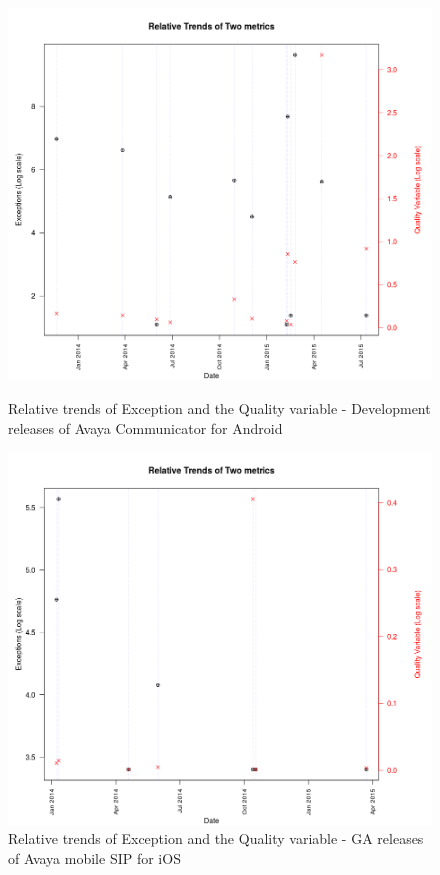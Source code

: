 \documentclass[smallcondensed]{svjour3}     %
\begin{document}
\begin{figure}[!t]
\begin{minipage}{.48\textwidth}
\raggedleft
\includegraphics[width=\linewidth]{trend_dev}
\caption{Relative trends of Exception and the Quality variable - Development releases of Avaya Communicator for Android}
\label{fig:trend_dev}
\end{minipage}
\hfill
\begin{minipage}{.48\textwidth}
\raggedright 
\includegraphics[width=\linewidth]{trend_ios}
\caption{Relative trends of Exception and the Quality variable - GA releases of Avaya mobile SIP for iOS}
\label{fig:trend_ios}
\end{minipage}
\end{figure}
\end{document}
